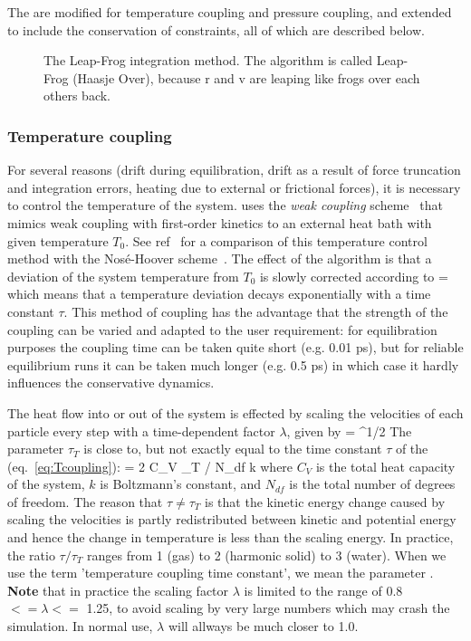 The  are modified for temperature coupling
 and pressure coupling, and extended to include the conservation of
constraints, all of which are described below.
\begin {figure}
\centerline{}
\caption[The Leap-Frog integration method.]{The Leap-Frog integration method. The algorithm is called
Leap-Frog  (Haasje Over), because r and v are leaping
like  frogs over each others back.}
\label{fig:leapfrog}
\end {figure}

\subsubsection{Temperature coupling}
For several reasons (drift during equilibration, drift as a result of
force truncation and integration errors, heating due to external or
frictional forces), it is necessary to control the temperature of the
system. \gromacs uses the {\em weak coupling} scheme~\cite{Berendsen84}
that mimics weak coupling with first-order kinetics to an external
heat bath with given temperature $T_0$. See ref~\cite{Berendsen91} for
a comparison of this temperature control method with the
Nos\'{e}-Hoover scheme~\cite{Nose84,Hoover85}. The effect of the algorithm is
that a deviation of the system temperature from $T_0$ is slowly
corrected according to
\beq
{} = 
\label{eq:Tcoupling}
\eeq
which means that a temperature deviation decays exponentially with a
time constant $\tau$.
This method of coupling has the advantage that the strength of the
coupling can be varied and adapted to the user requirement: for
equilibration purposes the coupling time can be taken quite short
(e.g. 0.01 ps), but for reliable equilibrium runs it can be taken much
longer (e.g. 0.5 ps) in which case it hardly influences the
conservative dynamics.
 
The heat flow into or out of the system is effected by scaling the
velocities of each particle every step with a time-dependent factor
$\lambda$, given by
\beq 
\lambda = ^{1/2}
\label{eq:lambda}
\eeq
The parameter $\tau_T$ is close to, but not exactly equal to the time constant
$\tau$ of the  (eq.~\ref{eq:Tcoupling}):
\beq
\tau = 2 C_V \tau_T / N_{df} k
\eeq
where $C_V$ is the total heat capacity of the system, $k$ is Boltzmann's
constant, and $N_{df}$ is the total number of degrees of freedom. The
reason that $\tau \neq \tau_T$ is that the kinetic energy change
caused by scaling the velocities is partly redistributed between
kinetic and potential energy and hence the change in temperature is
less than the scaling energy.  In practice, the ratio $\tau / \tau_T$
ranges from 1 (gas) to 2 (harmonic solid) to 3 (water). When we use
the term 'temperature coupling time constant', we mean the parameter
.  
{\bf Note} that in practice the scaling factor $\lambda$ is limited to 
the range of 0.8 $<= \lambda <=$ 1.25, to avoid scaling by very large
numbers which may crash the simulation. In normal use, 
$\lambda$ will allways be much closer to 1.0.
  
